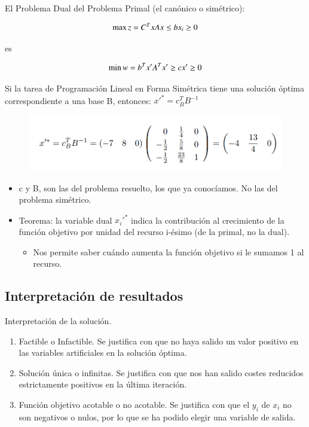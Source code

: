 \documentclass[12pt, twoside, openright]{report} %
\begin{document}
El Problema Dual del Problema Primal (el canónico o simétrico):

\begin{minipage}{.5\linewidth}
	$$\max z = C^{T}x \\  
	Ax\leq b \\ 
	x_{i} \geq 0$$
\end{minipage}
es
\begin{minipage}{.5\linewidth}
	$$\min w = b^{T}x' \\ 
	A^Tx' \geq c \\ 
	x' \geq 0$$
\end{minipage}

Si la tarea de Programación Lineal en Forma Simétrica tiene una
solución óptima correspondiente a una base B, entonces:
\(x'^*= c_B^TB^{-1}\)
\begin{figure}[H]
	{\includegraphics[scale=.4]{Untitled 14.png}}
\end{figure}

\begin{itemize}

	\item c y B, son las del problema resuelto, los que ya conocíamos. No las
	del problema simétrico.
	\item Teorema: la variable dual \(x_i'^*\) indica la contribución al
	crecimiento de la función objetivo por unidad del recurso i-ésimo
	(de la primal, no la dual).
	\begin{itemize}
		\item  Nos permite saber cuándo aumenta la función objetivo si le sumamos
	1 al recurso.
	\end{itemize}

\end{itemize}

\subsection{Interpretación de resultados}

Interpretación de la solución.

\begin{enumerate}
	\item Factible o Infactible. Se justifica con que no haya salido un valor positivo en las variables artificiales en la solución óptima.
	\item Solución única o infinitas. Se justifica con que nos han salido
	costes reducidos estrictamente positivos en la última iteración.
 	\item Función objetivo acotable o no acotable. Se justifica con que el
	\(y_i\) de \(x_i\) no son negativos o nulos, por lo que se ha
	podido elegir una variable de salida.
\end{enumerate}
\end{document}
